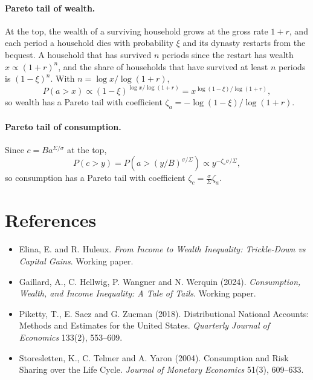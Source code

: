 \documentclass[12pt]{article}
\begin{document}
\paragraph*{Pareto tail of wealth.} At the top, the wealth of a surviving household grows at the gross rate $1+r$, and each period a household dies with probability $\xi$ and its dynasty restarts from the bequest. A household that has survived $n$ periods since the restart has wealth $x\propto(1+r)^n$, and the share of households that have survived at least $n$ periods is $(1-\xi)^n$. With $n=\log x/\log(1+r)$,
$$P(a>x)\propto(1-\xi)^{\log x/\log(1+r)}=x^{\log(1-\xi)/\log(1+r)},$$
so wealth has a Pareto tail with coefficient $\zeta_a=-\log(1-\xi)/\log(1+r)$.

\paragraph*{Pareto tail of consumption.} Since $c=Ba^{\Sigma/\sigma}$ at the top,
$$P(c>y)=P\left(a>(y/B)^{\sigma/\Sigma}\right)\propto y^{-\zeta_a\sigma/\Sigma},$$
so consumption has a Pareto tail with coefficient $\zeta_c=\frac{\sigma}{\Sigma}\zeta_a$.

\section*{References}
\begin{itemize}
\item Elina, E. and R. Huleux. \emph{From Income to Wealth Inequality: Trickle-Down vs Capital Gains}. Working paper.
\item Gaillard, A., C. Hellwig, P. Wangner and N. Werquin (2024). \emph{Consumption, Wealth, and Income Inequality: A Tale of Tails}. Working paper.
\item Piketty, T., E. Saez and G. Zucman (2018). Distributional National Accounts: Methods and Estimates for the United States. \emph{Quarterly Journal of Economics} 133(2), 553--609.
\item Storesletten, K., C. Telmer and A. Yaron (2004). Consumption and Risk Sharing over the Life Cycle. \emph{Journal of Monetary Economics} 51(3), 609--633.
\end{itemize}
\end{document}
